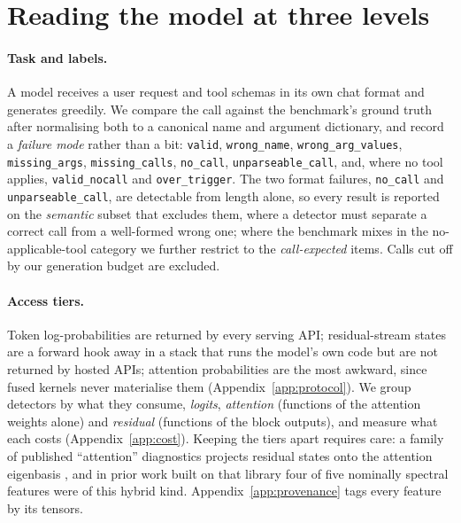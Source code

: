 \section{Reading the model at three levels}
\label{sec:method}

\paragraph{Task and labels.}
\label{sec:method:task}
A model receives a user request and tool schemas in its own chat format and generates greedily. We compare
the call against the benchmark's ground truth after normalising both to a canonical name and argument
dictionary, and record a \emph{failure mode} rather than a bit: \texttt{valid}, \texttt{wrong\_name},
\texttt{wrong\_arg\_values}, \texttt{missing\_args}, \texttt{missing\_calls}, \texttt{no\_call},
\texttt{unparseable\_call}, and, where no tool applies, \texttt{valid\_nocall} and \texttt{over\_trigger}. The
two format failures, \texttt{no\_call} and \texttt{unparseable\_call}, are detectable from length alone, so every
result is reported on the \emph{semantic} subset that excludes them, where a detector must separate a correct
call from a well-formed wrong one; where the benchmark mixes in the no-applicable-tool category we further
restrict to the \emph{call-expected} items. Calls cut off by our generation budget are excluded.

\paragraph{Access tiers.}
\label{sec:method:tiers}
Token log-probabilities are returned by every serving API; residual-stream states are a forward hook away in
a stack that runs the model's own code but are not returned by hosted APIs; attention probabilities are the
most awkward, since fused kernels never materialise them (Appendix~\ref{app:protocol}). We group detectors by
what they consume, \emph{logits}, \emph{attention} (functions of the attention weights alone) and
\emph{residual} (functions of the block outputs), and measure what each costs (Appendix~\ref{app:cost}).
Keeping the tiers apart requires care: a family of published ``attention'' diagnostics projects residual states
onto the attention eigenbasis \citep{noel2025gsp}, and in prior work built on that library four of five
nominally spectral features were of this hybrid kind. Appendix~\ref{app:provenance} tags every feature by its
tensors.


